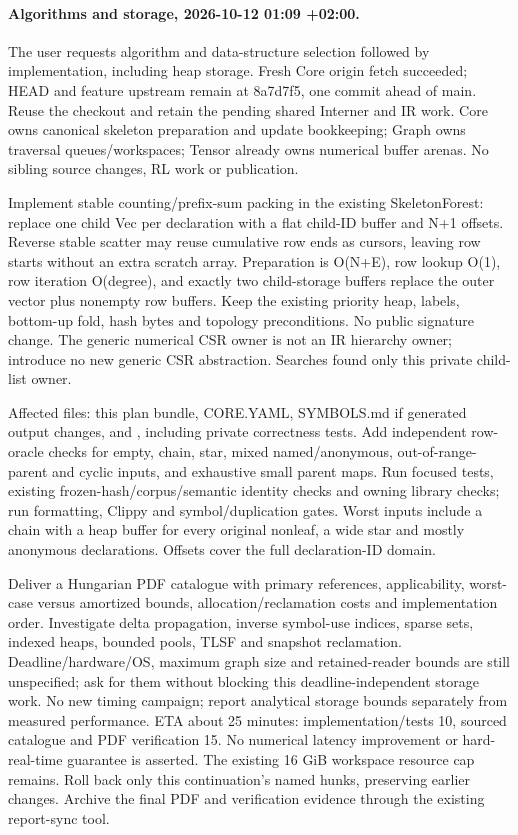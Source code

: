 \documentclass[11pt,a4paper]{article}
\begin{document}
\paragraph{Algorithms and storage, 2026-10-12 01:09 +02:00.}
The user requests algorithm and data-structure selection followed by implementation,
including heap storage. Fresh Core origin fetch succeeded; HEAD and feature
upstream remain at 8a7d7f5, one commit ahead of main. Reuse the checkout and retain
the pending shared Interner and IR work. Core owns canonical skeleton preparation
and update bookkeeping; Graph owns traversal queues/workspaces; Tensor already
owns numerical buffer arenas. No sibling source changes, RL work or publication.

Implement stable counting/prefix-sum packing in the existing SkeletonForest:
replace one child Vec per declaration with a flat child-ID buffer and N+1 offsets.
Reverse stable scatter may reuse cumulative row ends as cursors, leaving row
starts without an extra scratch array. Preparation is O(N+E), row lookup O(1),
row iteration O(degree), and exactly two child-storage buffers replace the outer
vector plus nonempty row buffers. Keep the existing priority heap, labels,
bottom-up fold, hash bytes and topology preconditions. No public signature change.
The generic numerical CSR owner is not an IR hierarchy owner; introduce no new
generic CSR abstraction. Searches found only this private child-list owner.

Affected files: this plan bundle, CORE.YAML, SYMBOLS.md if generated output changes,
and , including private correctness tests.
Add independent row-oracle checks for empty, chain, star, mixed named/anonymous,
out-of-range-parent and cyclic inputs, and exhaustive small parent maps. Run
focused tests, existing frozen-hash/corpus/semantic identity checks and owning
library checks; run formatting, Clippy and symbol/duplication gates. Worst inputs
include a chain with a heap buffer for every original nonleaf, a wide star and
mostly anonymous declarations. Offsets cover the full declaration-ID domain.

Deliver a Hungarian PDF catalogue with primary references, applicability,
worst-case versus amortized bounds, allocation/reclamation costs and implementation
order. Investigate delta propagation, inverse symbol-use indices, sparse sets,
indexed heaps, bounded pools, TLSF and snapshot reclamation. Deadline/hardware/OS,
maximum graph size and retained-reader bounds are still unspecified; ask for them
without blocking this deadline-independent storage work. No new timing campaign;
report analytical storage bounds separately from measured performance. ETA about
25 minutes: implementation/tests 10, sourced catalogue and PDF verification 15.
No numerical latency improvement or hard-real-time guarantee is asserted. The
existing 16 GiB workspace resource cap remains. Roll back only this continuation's
named hunks, preserving earlier changes. Archive the final PDF and verification
evidence through the existing report-sync tool.
\end{document}

